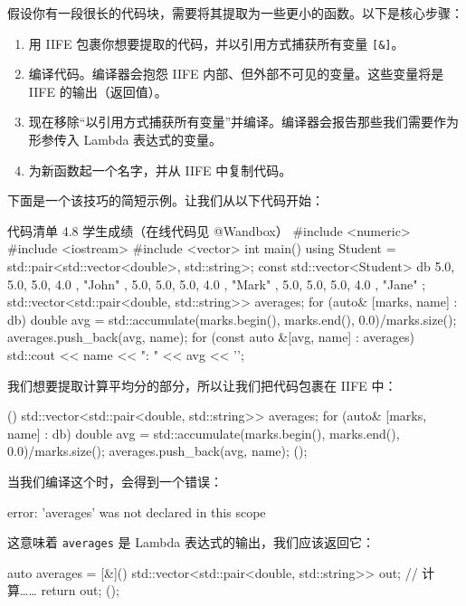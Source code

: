 假设你有一段很长的代码块，需要将其提取为一些更小的函数。以下是核心步骤：

\begin{enumerate}
\item 用 IIFE 包裹你想要提取的代码，并以引用方式捕获所有变量 \texttt{[\&]}。
\item 编译代码。编译器会抱怨 IIFE 内部、但外部不可见的变量。这些变量将是 IIFE 的输出（返回值）。
\item 现在移除“以引用方式捕获所有变量”并编译。编译器会报告那些我们需要作为形参传入 Lambda 表达式的变量。
\item 为新函数起一个名字，并从 IIFE 中复制代码。
\end{enumerate}

下面是一个该技巧的简短示例。让我们从以下代码开始：

\begin{codeboxt}{代码清单 4.8 学生成绩（在线代码见 @Wandbox）}
#include <numeric>
#include <iostream>
#include <vector>
int main() {
using Student = std::pair<std::vector<double>, std::string>;
const std::vector<Student> db { { { 5.0, 5.0, 5.0, 4.0 }, "John" },
{ { 5.0, 5.0, 5.0, 4.0 }, "Mark" },
{ { 5.0, 5.0, 5.0, 4.0 }, "Jane" } };
std::vector<std::pair<double, std::string>> averages;
for (auto& [marks, name] : db) {
double avg = std::accumulate(marks.begin(),
marks.end(), 0.0)/marks.size();
averages.push_back({avg, name});
}
for (const auto &[avg, name] : averages)
std::cout << name << ": " << avg << '\n';
}
\end{codeboxt}

我们想要提取计算平均分的部分，所以让我们把代码包裹在 IIFE 中：

\begin{codebox}
[&]() {
std::vector<std::pair<double, std::string>> averages;
for (auto& [marks, name] : db) {
double avg = std::accumulate(marks.begin(),
marks.end(), 0.0)/marks.size();
averages.push_back({avg, name});
}
}();
\end{codebox}

当我们编译这个时，会得到一个错误：

\begin{codebox}
error: 'averages' was not declared in this scope
\end{codebox}

这意味着 \texttt{averages} 是 Lambda 表达式的输出，我们应该返回它：

\begin{codebox}
auto averages = [&]() {
std::vector<std::pair<double, std::string>> out;
// 计算……
return out;
}();
\end{codebox}

